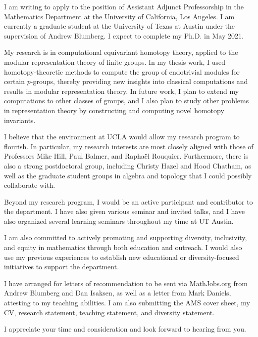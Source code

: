 I am writing to apply to the position of Assistant Adjunct Professorship in the Mathematics Department at the University of California, Los Angeles.  I am currently a graduate student at the University of Texas at Austin under the supervision of Andrew Blumberg.  I expect to complete my Ph.D. in May 2021.

My research is in computational equivariant homotopy theory, applied to the modular representation theory of finite groups.  In my thesis work, I used homotopy-theoretic methods to compute the group of endotrivial modules for certain $p$-groups, thereby providing new insights into classical computations and results in modular representation theory.  In future work, I plan to extend my computations to other classes of groups, and I also plan to study other problems in representation theory by constructing and computing novel homotopy invariants. 

I believe that the environment at UCLA would allow my research program to flourish. In particular, my research interests are most closely aligned with those of Professors Mike Hill, Paul Balmer, and Rapha\"el Rouquier.  Furthermore, there is also a strong postdoctoral group, including Christy Hazel and Hood Chatham, as well as the graduate student groups in algebra and topology that I could possibly collaborate with.

Beyond my research program, I would be an active participant and contributor to the department. I have also given various seminar and invited talks, and I have also organized several learning seminars throughout my time at UT Austin.

I am also committed to actively promoting and supporting diversity, inclusivity, and equity in mathematics through both education and outreach.  I would also use my previous experiences to establish new educational or diversity-focused initiatives to support the department.

I have arranged for letters of recommendation to be sent via MathJobs.org from Andrew Blumberg and 
Dan Isaksen, as well as a letter from Mark Daniels,
attesting to my teaching abilities. I am also submitting the AMS cover
sheet, my CV, research statement, teaching statement, and diversity statement. 

I appreciate your time and consideration and look forward to hearing from you.